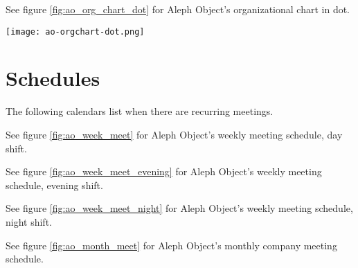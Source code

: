 See figure \ref{fig:ao_org_chart_dot} for Aleph Object's organizational chart in dot.

\begin{sidewaysfigure}[p]
\texttt{[image: ao-orgchart-dot.png]}
 \caption{Aleph Objects Org Chart dot}
 \label{fig:ao_org_chart_dot}
\end{sidewaysfigure}

\section{Schedules}
The following calendars list when there are recurring meetings.


See figure \ref{fig:ao_week_meet} for Aleph Object's weekly meeting schedule, day shift.

See figure \ref{fig:ao_week_meet_evening} for Aleph Object's weekly meeting schedule, evening shift.

See figure \ref{fig:ao_week_meet_night} for Aleph Object's weekly meeting schedule, night shift.

See figure \ref{fig:ao_month_meet} for Aleph Object's monthly company meeting schedule.
